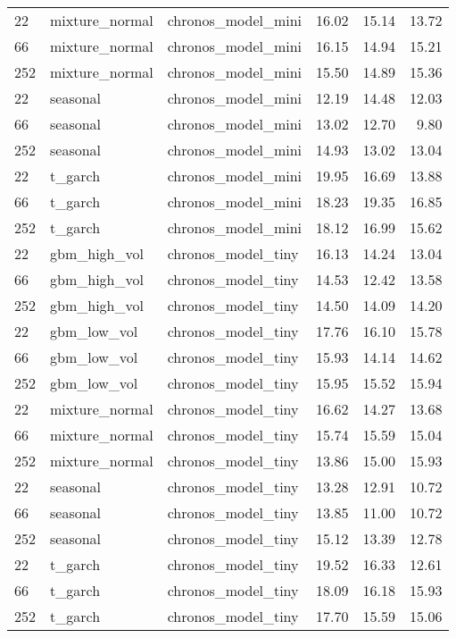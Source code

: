 {\begin{tabular}{lllrrr}
\midrule
22 & mixture\_normal & chronos\_model\_mini & 16.02 & 15.14 & 13.72 \\
66 & mixture\_normal & chronos\_model\_mini & 16.15 & 14.94 & 15.21 \\
252 & mixture\_normal & chronos\_model\_mini & 15.50 & 14.89 & 15.36 \\
\midrule
22 & seasonal & chronos\_model\_mini & 12.19 & 14.48 & 12.03 \\
66 & seasonal & chronos\_model\_mini & 13.02 & 12.70 & 9.80 \\
252 & seasonal & chronos\_model\_mini & 14.93 & 13.02 & 13.04 \\
\midrule
22 & t\_garch & chronos\_model\_mini & 19.95 & 16.69 & 13.88 \\
66 & t\_garch & chronos\_model\_mini & 18.23 & 19.35 & 16.85 \\
252 & t\_garch & chronos\_model\_mini & 18.12 & 16.99 & 15.62 \\
\midrule
22 & gbm\_high\_vol & chronos\_model\_tiny & 16.13 & 14.24 & 13.04 \\
66 & gbm\_high\_vol & chronos\_model\_tiny & 14.53 & 12.42 & 13.58 \\
252 & gbm\_high\_vol & chronos\_model\_tiny & 14.50 & 14.09 & 14.20 \\
\midrule
22 & gbm\_low\_vol & chronos\_model\_tiny & 17.76 & 16.10 & 15.78 \\
66 & gbm\_low\_vol & chronos\_model\_tiny & 15.93 & 14.14 & 14.62 \\
252 & gbm\_low\_vol & chronos\_model\_tiny & 15.95 & 15.52 & 15.94 \\
\midrule
22 & mixture\_normal & chronos\_model\_tiny & 16.62 & 14.27 & 13.68 \\
66 & mixture\_normal & chronos\_model\_tiny & 15.74 & 15.59 & 15.04 \\
252 & mixture\_normal & chronos\_model\_tiny & 13.86 & 15.00 & 15.93 \\
\midrule
22 & seasonal & chronos\_model\_tiny & 13.28 & 12.91 & 10.72 \\
66 & seasonal & chronos\_model\_tiny & 13.85 & 11.00 & 10.72 \\
252 & seasonal & chronos\_model\_tiny & 15.12 & 13.39 & 12.78 \\
\midrule
22 & t\_garch & chronos\_model\_tiny & 19.52 & 16.33 & 12.61 \\
66 & t\_garch & chronos\_model\_tiny & 18.09 & 16.18 & 15.93 \\
252 & t\_garch & chronos\_model\_tiny & 17.70 & 15.59 & 15.06 \\

\end{tabular}}
